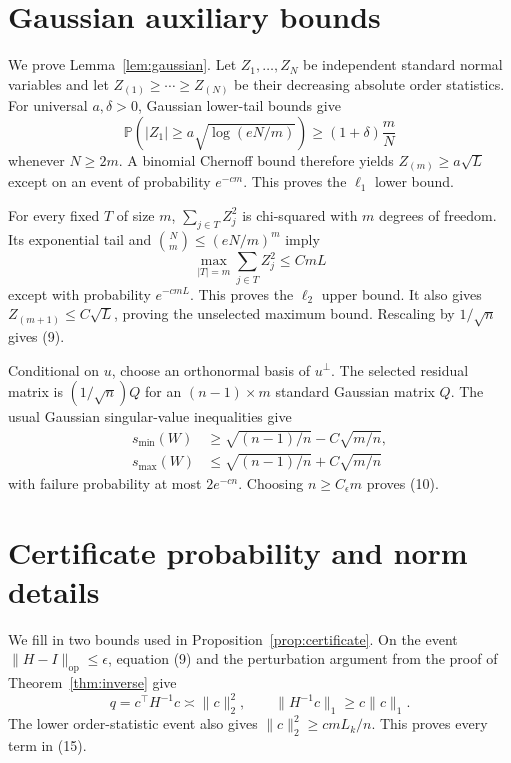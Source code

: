 \documentclass[twoside]{article}
\newcommand{\Prob}{\mathbb P}
\begin{document}


\appendix
\thispagestyle{empty}
\onecolumn

\section{Gaussian auxiliary bounds}
\label{app:gaussian}

We prove Lemma~\ref{lem:gaussian}. Let $Z_1,\ldots,Z_N$ be independent
standard normal variables and let $Z_{(1)}\geq\cdots\geq Z_{(N)}$ be their
decreasing absolute order statistics. For universal $a,\delta>0$, Gaussian
lower-tail bounds give
\[
 \Prob(|Z_1|\geq a\sqrt{\log(eN/m)})
 \geq(1+\delta)\frac{m}{N}
\]
whenever $N\geq2m$. A binomial Chernoff bound therefore yields
$Z_{(m)}\geq a\sqrt{L}$ except on an event of probability $e^{-cm}$.
This proves the $\ell_1$ lower bound.

For every fixed $T$ of size $m$, $\sum_{j\in T}Z_j^2$ is chi-squared with
$m$ degrees of freedom. Its exponential tail and
$\binom Nm\leq(eN/m)^m$ imply
\[
 \max_{|T|=m}\sum_{j\in T}Z_j^2\leq CmL
\]
except with probability $e^{-cmL}$. This proves the $\ell_2$ upper bound. It
also gives $Z_{(m+1)}\leq C\sqrt L$, proving the unselected maximum bound.
Rescaling by $1/\sqrt n$ gives (9).

Conditional on $u$, choose an orthonormal basis of $u^\perp$. The selected
residual matrix is $(1/\sqrt n)Q$ for an $(n-1)\times m$ standard Gaussian
matrix $Q$. The usual Gaussian singular-value inequalities give
\begin{align*}
 s_{\min}(W)&\geq\sqrt{(n-1)/n}-C\sqrt{m/n},\\
 s_{\max}(W)&\leq\sqrt{(n-1)/n}+C\sqrt{m/n}
\end{align*}
with failure probability at most $2e^{-cn}$. Choosing $n\geq C_\epsilon m$
proves (10).

\section{Certificate probability and norm details}
\label{app:certificate}

We fill in two bounds used in Proposition~\ref{prop:certificate}. On the event
$\|H-I\|_{\mathrm{op}}\leq\epsilon$, equation (9) and the perturbation argument
from the proof of Theorem~\ref{thm:inverse} give
\[
 q=c^\top H^{-1}c\asymp\|c\|_2^2,
 \qquad
 \|H^{-1}c\|_1\geq c\|c\|_1.
\]
The lower order-statistic event also gives
$\|c\|_2^2\geq cmL_k/n$. This proves every term in (15).
\end{document}
